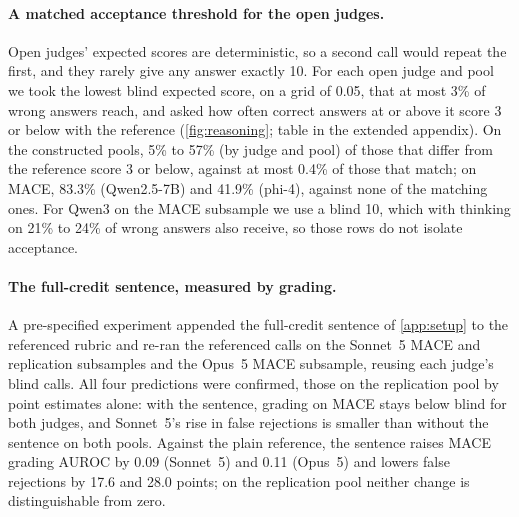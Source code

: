 \paragraph{A matched acceptance threshold for the open judges.}
Open judges' expected scores are deterministic, so a second call would repeat the first, and they rarely give any answer exactly 10. For each open judge and pool we took the lowest blind expected score, on a grid of 0.05, that at most 3\% of wrong answers reach, and asked how often correct answers at or above it score 3 or below with the reference (\cref{fig:reasoning}; table in the extended appendix). On the constructed pools, 5\% to 57\% (by judge and pool) of those that differ from the reference score 3 or below, against at most 0.4\% of those that match; on \textsc{MACE}, 83.3\% (Qwen2.5-7B) and 41.9\% (phi-4), against none of the matching ones.\ph{} For Qwen3 on the \textsc{MACE} subsample we use a blind 10, which with thinking on 21\% to 24\% of wrong answers also receive, so those rows do not isolate acceptance.
\paragraph{The full-credit sentence, measured by grading.}
A pre-specified experiment appended the full-credit sentence of \cref{app:setup} to the referenced rubric and re-ran the referenced calls on the Sonnet~5 \textsc{MACE} and replication subsamples and the Opus~5 \textsc{MACE} subsample, reusing each judge's blind calls. All four predictions were confirmed, those on the replication pool by point estimates alone: with the sentence, grading on \textsc{MACE} stays below blind for both judges, and Sonnet~5's rise in false rejections is smaller than without the sentence on both pools. Against the plain reference, the sentence raises \textsc{MACE} grading AUROC by 0.09 (Sonnet~5) and 0.11 (Opus~5) and lowers false rejections by 17.6 and 28.0 points; on the replication pool neither change is distinguishable from zero.\ph

